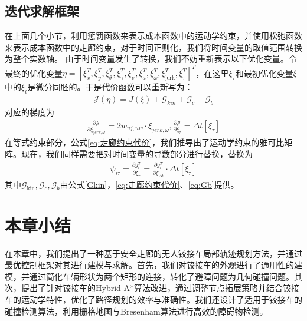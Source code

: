 \documentclass[master,academic]{ysuthesis} %
\begin{document}
		\subsection{迭代求解框架}
		在上面几个小节，利用惩罚函数来表示成本函数中的运动学约束，并使用松弛函数来表示成本函数中的走廊约束，对于时间正则化，我们将时间变量的取值范围转换为整个实数轴。
		由于时间变量发生了转换，我们不妨重新表示以下优化变量。令最终的优化变量$\eta =\left[ \xi _{x}^{T},\xi _{y}^{T},\xi _{\theta}^{T},\xi _{\gamma}^{T},\xi _{v}^{T},\xi _{a}^{T},\xi _{\omega}^{T},\xi _{\text{jerk}}^{T},\xi _{\tau}^{T} \right] ^T$，在这里$\xi _{\tau}$和最初优化变量$\xi$中的$\xi _{t}$是微分同胚的。于是代价函数可以重新写为：
		\begin{equation}
			\begin{aligned}
				\mathcal{J}\left( \eta \right) =J\left( \xi \right) +\mathcal{G}_{kin}+\mathcal{G}_c+\mathcal{G}_b
			\end{aligned}
		\end{equation}
		对应的梯度为
		\begin{equation}
			\begin{aligned}
				\frac{\partial \mathcal{J}}{\partial \xi _{jerk,\omega}}=2w_{uj,uw}\cdot \xi _{jerk,\omega},\frac{\partial \mathcal{J}}{\partial \xi _{\tau}}=\Delta t\left[ \xi _{\tau} \right]
			\end{aligned}
		\end{equation}
		在等式约束部分，公式\ref{eq:走廊约束代价}，我们推导出了运动学约束的雅可比矩阵。现在，我们同样需要把对时间变量的导数部分进行替换，替换为
		\begin{equation}
			\begin{aligned}
				\psi _{i\tau}=\frac{\partial g_{i}^{T}}{\partial \xi _{\tau}}=\frac{\partial g_{i}^{T}}{\partial \xi _{\Delta t}}\cdot \Delta t\left[ \xi _{\tau} \right] 
			\end{aligned}
		\end{equation}
		其中$\mathcal{G}_{\text{kin}},\mathcal{G}_c,\mathcal{G}_b$由公式\ref{Gkin}，\ref{eq:走廊约束代价}、\ref{eq:Gb}提供。

	\section{本章小结}
	在本章中，我们提出了一种基于安全走廊的无人铰接车局部轨迹规划方法，并通过最优控制框架对其进行建模与求解。首先，我们对铰接车的外观进行了通用性的建模，并通过简化车辆形状为两个矩形的连接，转化了避障问题为几何碰撞问题。其次，提出了针对铰接车的Hybrid A*算法改进，通过调整节点拓展策略并结合铰接车的运动学特性，优化了路径规划的效率与准确性。我们还设计了适用于铰接车的碰撞检测算法，利用栅格地图与Bresenham算法进行高效的障碍物检测。
\end{document}
